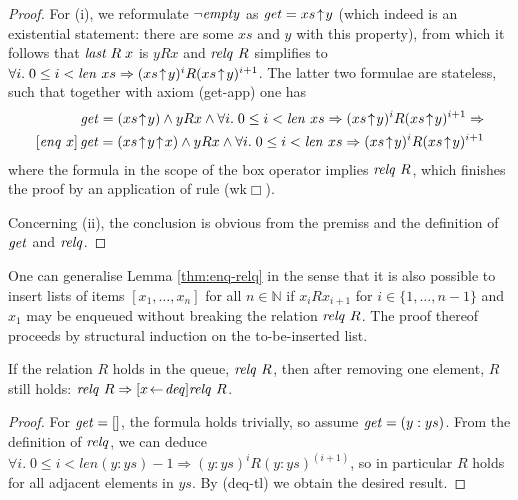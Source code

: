 \begin{proof} 
  For (i), we reformulate $\lnot \mathit{empty}$ as $\mathit{get} = xs\!\uparrow\! y$ (which indeed is an
  existential statement: there are some $xs$ and $y$ with this property), from
  which it follows that $\mathit{last}\;R\;x$ is $yRx$ and $\mathit{relq}\ R$ simplifies to 
  $\forall i.\; 0\leq i<\mathit{len}\ xs \Rightarrow (xs\!\uparrow\! y)^iR(xs\!\uparrow\! y)^{i+1}$. The latter two formulae
  are stateless, such that together with axiom (get-app) one has
  \begin{equation*}\begin{split}
 \get = (xs\Snoc y) \land yRx \land \forall i\bnd 0\leq i<\op{len}\ xs \Rightarrow (xs\Snoc y)^iR(xs\Snoc y)^{i+1} \Rightarrow \\
  \PDLBox{\enq\ x}{\get = (xs\Snoc y\Snoc x) \land yRx \land \forall i\bnd 0\leq i<\op{len}\ xs \Rightarrow (xs\Snoc
    y)^iR(xs\Snoc y)^{i+1}}
  \end{split}
  \end{equation*}
where the formula in the scope of the box operator implies $\mathit{relq}\ R$, which finishes
  the proof by an application of rule (wk$\Box$).


  Concerning (ii), the conclusion is obvious from the premiss and the definition
  of $\mathit{get}$ and $\mathit{relq}$.
\end{proof}


\begin{rem}
\label{rem:ext-enq-relq}
One can generalise Lemma \ref{thm:enq-relq} in the sense that it is also
possible to insert lists of items $[x_1,\ldots ,x_n]$ for all $n \in \mathbb{N}$ if
$x_i R x_{i+1}$ for $i \in \{1,\ldots,n-1 \}$ and $x_1$ may be enqueued without breaking
the relation $\mathit{relq}\ R$.  The proof thereof proceeds by
structural induction on the to-be-inserted list.
\end{rem}

\begin{lem}
\label{thm:relq-deq}
If the relation $R$ holds in the queue, \IE $\mathit{relq}\  R$, then after removing one
element, $R$ still holds: $\mathit{relq}\  R \Rightarrow [x\!\gets\!\mathit{deq}]\mathit{relq}\  R$. 
\end{lem}

\begin{proof}
For $\mathit{get} = []$, the formula holds trivially, so assume $\mathit{get} = (y: ys)$. From
the definition of $\mathit{relq}$, we can deduce $\forall i.\; 0\leq i<len (y: ys) - 1 \Rightarrow
(y: ys)^iR(y: ys)^{(i+1)}$, so in particular $R$ holds for all adjacent
elements in $ys$. By (deq-tl) we obtain the desired result.
\end{proof}


